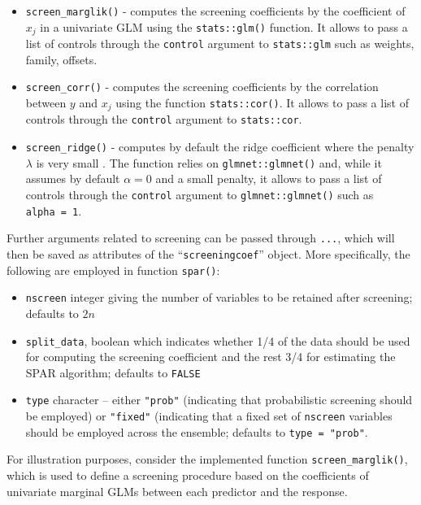 \documentclass[
  article]{jss}
\begin{document}
\begin{itemize}
\item
  \texttt{screen\_marglik()} - computes the screening coefficients by
  the coefficient of \(x_j\) in a univariate GLM using the
  \texttt{stats::glm()} function. It allows to pass a list of controls
  through the \texttt{control} argument to \texttt{stats::glm} such as
  weights, family, offsets.
\item
  \texttt{screen\_corr()} - computes the screening coefficients by the
  correlation between \(y\) and \(x_j\) using the function
  \texttt{stats::cor()}. It allows to pass a list of controls through
  the \texttt{control} argument to \texttt{stats::cor}.
\item
  \texttt{screen\_ridge()} - computes by default the ridge coefficient
  where the penalty \(\lambda\) is very small \citep[see][ for
  motivation]{parzer2024glms}. The function relies on
  \texttt{glmnet::glmnet()} and, while it assumes by default
  \(\alpha = 0\) and a small penalty, it allows to pass a list of
  controls through the \texttt{control} argument to
  \texttt{glmnet::glmnet()} such as \texttt{alpha\ =\ 1}.
\end{itemize}

Further arguments related to screening can be passed through
\texttt{...}, which will then be saved as attributes of the
``\texttt{screeningcoef}'' object. More specifically, the following are
employed in function \texttt{spar()}:

\begin{itemize}
\item
  \texttt{nscreen} integer giving the number of variables to be retained
  after screening; defaults to \(2n\)
\item
  \texttt{split\_data}, boolean which indicates whether 1/4 of the data
  should be used for computing the screening coefficient and the rest
  3/4 for estimating the SPAR algorithm; defaults to \texttt{FALSE}
\item
  \texttt{type} character -- either \texttt{"prob"} (indicating that
  probabilistic screening should be employed) or \texttt{"fixed"}
  (indicating that a fixed set of \texttt{nscreen} variables should be
  employed across the ensemble; defaults to \texttt{type\ =\ "prob"}.
\end{itemize}

For illustration purposes, consider the implemented function
\texttt{screen\_marglik()}, which is used to define a screening
procedure based on the coefficients of univariate marginal GLMs between
each predictor and the response.
\end{document}

